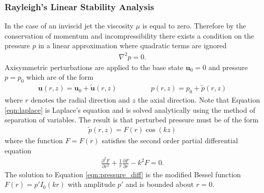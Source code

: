 \documentclass[11pt]{article}
\newcommand{\pd}[2]{\frac{\partial #1}{\partial #2}}
\newcommand{\pdtwo}[2]{\frac{\partial ^2 #1}{\partial #2 ^2}}
\begin{document}
\subsubsection{Rayleigh's Linear Stability Analysis}
In the case of an inviscid jet the viscosity $\mu$ is equal to zero. Therefore 
by the conservation of momentum and incompressibility there exists a condition 
on the pressure $p$  in a linear approximation where quadratic terms are 
ignored
\begin{align}
\nabla^2p = 0.
\label{eqn:laplace}
\end{align}
Axisymmetric perturbations are applied to the base state $\mathbf{u}_0 = 0$ and 
pressure $p = p_0$ which are of the form
\begin{align}
\mathbf{u}(r,z) = \mathbf{u}_0 + \tilde{\mathbf{u}}(r,z) \hspace{2cm} p(r,z) = 
p_0 + \tilde{p}(r,z)
\end{align}
where $r$ denotes the radial direction and $z$ the axial direction. Note that 
Equation \ref{eqn:laplace} is Laplace's equation and is solved analytically 
using the method of separation of variables. The result is that perturbed 
pressure must be of the form
\begin{align}
\tilde{p}(r,z) = F(r) \cos(kz)
\label{eqn:pressure_perturb}
\end{align}
where the function $F = F(r)$ satisfies the second order partial differential 
equation
\begin{align}
\pdtwo{F}{r} + \frac{1}{r} \pd{F}{r} -k^2 F = 0.
\label{eqn:pressure_diff}
\end{align}
The solution to Equation \ref{eqn:pressure_diff} is the modified Bessel 
function $F(r)=p'I_0(kr)$ with amplitude $p'$ and is bounded about $r=0$.
\end{document}
